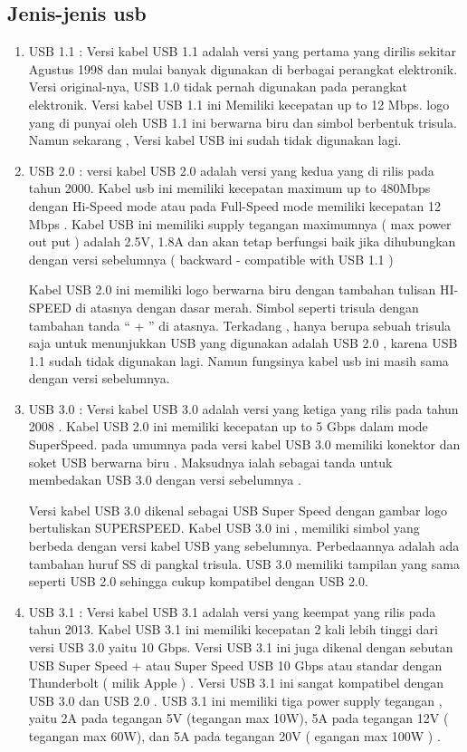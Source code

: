 \subsection {Jenis-jenis usb}
\begin {enumerate}
\item
	USB 1.1 : Versi kabel USB 1.1 adalah versi yang pertama yang dirilis sekitar Agustus 1998 dan mulai banyak digunakan di berbagai perangkat elektronik. Versi original-nya, USB 1.0 tidak pernah digunakan pada perangkat elektronik. Versi kabel USB 1.1 ini Memiliki kecepatan up to 12 Mbps. logo yang di punyai oleh USB 1.1 ini berwarna biru dan simbol berbentuk trisula. Namun sekarang , Versi kabel USB ini sudah tidak digunakan lagi.
\item
	USB 2.0 : versi kabel USB 2.0 adalah versi yang kedua yang di rilis pada tahun 2000. Kabel usb ini memiliki kecepatan maximum up to 480Mbps dengan Hi-Speed mode atau pada Full-Speed mode memiliki kecepatan 12 Mbps . Kabel USB ini memiliki supply tegangan maximumnya ( max power out put ) adalah 2.5V, 1.8A dan akan tetap berfungsi baik jika dihubungkan dengan versi sebelumnya ( backward - compatible with USB 1.1 )
	
	Kabel USB 2.0 ini memiliki logo berwarna biru dengan tambahan tulisan HI-SPEED di atasnya dengan dasar merah. Simbol seperti trisula dengan tambahan tanda “ + ” di atasnya. Terkadang , hanya berupa sebuah trisula saja untuk menunjukkan USB yang digunakan adalah USB 2.0 , karena USB 1.1 sudah tidak digunakan lagi. Namun fungsinya kabel usb ini masih sama dengan versi sebelumnya.
\item
	USB 3.0 : Versi kabel USB 3.0 adalah versi yang ketiga yang rilis pada tahun 2008 . Kabel USB 2.0 ini memiliki kecepatan up to 5 Gbps dalam mode SuperSpeed. pada umumnya pada versi kabel USB 3.0 memiliki konektor dan soket USB berwarna biru . Maksudnya ialah sebagai tanda untuk membedakan USB 3.0 dengan versi sebelumnya .
	
	Versi kabel USB 3.0 dikenal sebagai USB Super Speed dengan gambar logo bertuliskan SUPERSPEED. Kabel USB 3.0 ini , memiliki simbol yang berbeda dengan versi kabel USB yang sebelumnya. Perbedaannya adalah ada tambahan huruf SS di pangkal trisula. USB 3.0 memiliki tampilan yang sama seperti USB 2.0 sehingga cukup kompatibel dengan USB 2.0.
	
\item
	USB 3.1 : Versi kabel USB 3.1 adalah versi yang keempat yang rilis pada tahun 2013. Kabel USB 3.1 ini memiliki kecepatan 2 kali lebih tinggi dari versi USB 3.0 yaitu 10 Gbps. Versi USB 3.1 ini juga dikenal dengan sebutan USB Super Speed + atau Super Speed USB 10 Gbps atau standar dengan Thunderbolt ( milik Apple ) . Versi USB 3.1 ini sangat kompatibel dengan USB 3.0 dan USB 2.0 . USB 3.1 ini memiliki tiga power supply tegangan , yaitu 2A pada tegangan 5V (tegangan max 10W), 5A pada tegangan 12V ( tegangan max 60W), dan 5A pada tegangan 20V ( egangan max 100W ) .
\end {enumerate}
	
